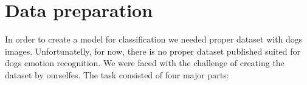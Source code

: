 \documentclass[11pt]{diazessay} %
\begin{document}

\vspace{10pt} %


\section*{Data preparation}
In order to create a model for classification we needed proper dataset with dogs images. Unfortunatelly, for now, there is no proper dataset published suited for dogs emotion recognition. We were faced with the challenge of creating the dataset by ourselfes. The task consisted of four major parts:
\end{document}
